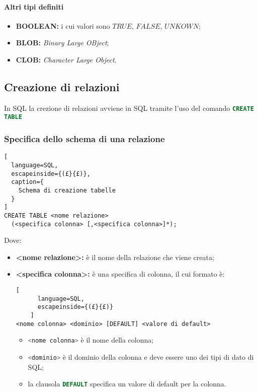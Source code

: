\paragraph{Altri tipi definiti}%
\label{par:Altri tipi definiti}
\begin{itemize}
  \item \textbf{BOOLEAN:} i cui valori sono $TRUE$, $FALSE$, $UNKOWN$;
  \item \textbf{BLOB:} \emph{Binary Large OBject};
  \item \textbf{CLOB:} \emph{Character Large Object}.
\end{itemize}

\subsection{Creazione di relazioni}%
\label{sub:Creazione di relazioni}
In SQL la crezione di relazioni avviene in SQL tramite l'uso del comando
\lstinline[language=SQL]{CREATE TABLE}

\subsubsection{Specifica dello schema di una relazione}%
\label{ssub:Specifica dello schema di una relazione}
\begin{lstlisting}[
  language=SQL,
  escapeinside={(£}{£)},
  caption={
    Schema di creazione tabelle
  }
]
CREATE TABLE <nome relazione>
  (<specifica colonna> [,<specifica colonna>]*);
\end{lstlisting}

Dove:
\begin{itemize}
  \item \textbf{<nome relazione>:} è il nome della relazione che viene creata;
  \item \textbf{<specifica colonna>:} è una specifica di colonna, il cui formato
    è:
    \begin{lstlisting}[
      language=SQL,
      escapeinside={(£}{£)}
    ]
<nome colonna> <dominio> [DEFAULT] <valore di default>
    \end{lstlisting}
    \begin{itemize}
      \item \lstinline[language=SQL]{<nome colonna>} è il nome della colonna;
      \item \lstinline[language=SQL]{<dominio>} è il dominio della colonna e
        deve essere uno dei tipi di dato di SQL;
      \item la clausola \lstinline[language=SQL]{DEFAULT} specifica un valore di
        default per la colonna.
    \end{itemize}
\end{itemize}

